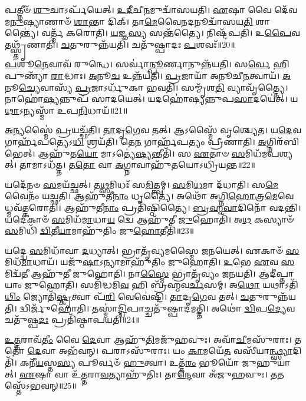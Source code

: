 𑌪𑌤𑍍𑌨𑍀𑍞᳴ \ul{𑌶𑍁}\-𑌚𑌾\-𑌽𑌰𑍍𑌪᳴𑌯𑍇𑌤𑍍।
\-\ul{𑌉}\-\-\ul{𑌦𑍀}\-𑌚𑍀\-\ul{𑌨}\-𑌮𑍁𑌦𑍍𑌵𑌾᳴𑌸𑌯𑌤𑌿।
\-\ul{𑌏}\-𑌷𑌾 𑌵𑍈 𑌦𑍇᳴𑌵𑌮\-\ul{𑌨𑍁}\-𑌷𑍍𑌯𑌾𑌣𑌾𑍞᳴ \ul{𑌶𑌾}\-𑌨𑍍𑌤𑌾 𑌦𑌿𑌕𑍍।
𑌤𑌾\-\ul{𑌮𑍇}\-𑌵𑍈\-\ul{𑌨}\-𑌦𑌨𑍂𑌦𑍍𑌵𑌾᳴𑌸𑌯\-\ul{𑌤𑌿} 𑌶𑌾𑌨𑍍𑌤𑍍𑌯𑍈॑।
𑌵𑌰𑍍𑌤𑍍𑌮᳴ 𑌕𑌰𑍋𑌤𑌿।
\-\ul{𑌯}\-𑌜𑍍𑌞\-\ul{𑌸𑍍𑌯} 𑌸𑌨𑍍𑌤᳴𑌤𑍍𑌯𑍈।
𑌨𑌿𑌷𑍍𑌟᳴𑌪𑌤𑌿।
𑌉\-\ul{𑌪𑍈}\-𑌵 𑌤𑌥𑍍𑌸𑍍𑌤𑍃᳴𑌣𑌾𑌤𑌿।
\-\ul{𑌚}\-𑌤𑍁𑌰𑍁𑌨𑍍𑌨᳴𑌯𑌤𑌿।
𑌚𑌤𑍁᳴𑌷𑍍𑌪𑌾𑌦𑌃 \ul{𑌪}\-𑌶𑌵𑌃᳴॥20॥

\-\ul{𑌪}\-𑌶𑍂\-\ul{𑌨𑍇}\-𑌵𑌾𑌵᳴ 𑌰𑍁𑌨𑍍𑌧𑍇।
𑌸𑌰𑍍𑌵𑌾॑\-\ul{𑌨𑍍𑌪𑍂}\-𑌰𑍍𑌣𑌾𑌨𑍁𑌨𑍍𑌨᳴𑌯𑌤𑌿।
𑌸\-\ul{𑌰𑍍𑌵𑍇} 𑌹𑌿 𑌪𑍁𑌣𑍍𑌯𑌾᳴ \ul{𑌰𑌾}\-𑌦𑍍𑌧𑌾𑌃।
\-\ul{𑌅}\-𑌨𑍂\-\ul{𑌚} 𑌉𑌨𑍍𑌨᳴𑌯𑌤𑌿।
\-\ul{𑌪𑍍𑌰}\-𑌜𑌾𑌯𑌾᳴ 𑌅𑌨𑍂𑌚𑍀\-\ul{𑌨}\-𑌤𑍍𑌵𑌾𑌯᳴।
\-\ul{𑌅}\-𑌨𑍂\-\ul{𑌚𑍍𑌯𑍇}\-𑌵𑌾𑌸𑍍𑌯᳴ \ul{𑌪𑍍𑌰}\-𑌜𑌾\-𑌽𑌰𑍍𑌧𑍁᳴𑌕𑌾 𑌭𑌵𑌤𑌿।
𑌸𑌮𑍍𑌮𑍃᳴𑌶\-\ul{𑌤𑌿} 𑌵𑍍𑌯𑌾𑌵𑍃᳴𑌤𑍍𑌤𑍍𑌯𑍈।
𑌨𑌾𑌹𑍋॑\-\ul{𑌷𑍍𑌯}\-𑌨𑍍𑌨𑍁𑌪᳴ 𑌸𑌾𑌦𑌯𑍇𑌤𑍍।
𑌯𑌦𑌹𑍋॑𑌷𑍍𑌯𑌨𑍍𑌨𑍁𑌪\-\ul{𑌸𑌾}\-𑌦𑌯𑍇॑𑌤𑍍।
𑌯\-\ul{𑌥𑌾}\-𑌽𑌨𑍍𑌯𑌸𑍍𑌮𑌾᳴ 𑌉𑌪\-\ul{𑌨𑌿}\-𑌧𑌾𑌯᳴॥21॥

\-\ul{𑌅}\-𑌨𑍍𑌯𑌸𑍍𑌮𑍈॑ \ul{𑌪𑍍𑌰}\-𑌯𑌚𑍍𑌛᳴𑌤𑌿।
\-\ul{𑌤𑌾}\-𑌦𑍃\-\ul{𑌗𑍇}\-𑌵 𑌤𑌤𑍍।
𑌆𑌽𑌸𑍍𑌮𑍈᳴ 𑌵𑍃𑌶𑍍𑌚𑍍𑌯𑍇𑌤।
𑌯\-\ul{𑌦𑍇}\-𑌵 𑌗𑌾𑌰𑍍\mbox{}𑌹᳴𑌪𑌤𑍍𑌯𑍇𑌽\-\ul{𑌧𑌿} 𑌶𑍍𑌰𑌯᳴𑌤𑌿।
𑌤𑍇\-\ul{𑌨} 𑌗𑌾𑌰𑍍\mbox{}𑌹᳴𑌪𑌤𑍍𑌯𑌂 𑌪𑍍𑌰𑍀𑌣𑌾𑌤𑌿।
\-\ul{𑌅}\-𑌗𑍍𑌨𑌿𑌰᳴𑌬𑌿𑌭𑍇𑌤𑍍।
𑌆𑌹𑍁᳴𑌤\-\ul{𑌯𑍋} 𑌮𑌾𑌽𑌤𑍍𑌯𑍇॑\-\ul{𑌷𑍍𑌯}\-𑌨𑍍𑌤𑍀𑌤𑌿᳴।
𑌸 \ul{𑌏}\-𑌤𑌾𑍞 \ul{𑌸}\-𑌮𑌿𑌧᳴𑌮𑌪𑌶𑍍𑌯𑌤𑍍।
𑌤𑌾𑌮𑌾𑌽𑌧᳴𑌤𑍍𑌤।
𑌤\-\ul{𑌤𑍋} 𑌵𑌾 \ul{𑌅}\-𑌗𑍍𑌨𑌾𑌵𑌾𑌹𑍁᳴𑌤𑌯𑍋\-𑌽𑌧𑍍𑌰𑌿𑌯𑌨𑍍𑌤॥22॥

𑌯𑌦𑍇᳴𑌨𑍞 \ul{𑌸}\-𑌮𑌯᳴𑌚𑍍𑌛𑌤𑍍।
𑌤\-\ul{𑌥𑍍𑌸}\-𑌮𑌿𑌧𑌃᳴ 𑌸\-\ul{𑌮𑌿}\-𑌤𑍍𑌤𑍍𑌵𑌮𑍍।
\-\ul{𑌸}\-𑌮𑌿\-\ul{𑌧}\-𑌮𑌾 𑌦᳴𑌧𑌾𑌤𑌿।
𑌸\-\ul{𑌮𑍇}\-𑌵𑍈𑌨𑌂᳴ 𑌯𑌚𑍍𑌛𑌤𑌿।
𑌆𑌹𑍁᳴𑌤𑍀\-\ul{𑌨𑌾𑌂} 𑌧𑍃𑌤𑍍𑌯𑍈॑।
𑌅𑌥𑍋᳴ 𑌅𑌗𑍍𑌨𑌿\-\ul{𑌹𑍋}\-𑌤𑍍𑌰\-\ul{𑌮𑍇}\-𑌵𑍇𑌧𑍍𑌮𑌵᳴𑌤𑍍𑌕𑌰𑍋𑌤𑌿।
𑌆𑌹𑍁᳴𑌤𑍀\-\ul{𑌨𑌾𑌂} 𑌪𑍍𑌰𑌤𑌿᳴\-𑌷𑍍𑌠𑌿𑌤𑍍𑌯𑍈।
\-\ul{𑌬𑍍𑌰}\-\-\ul{𑌹𑍍𑌮}\-\-\ul{𑌵𑌾}\-𑌦𑌿𑌨𑍋᳴ 𑌵𑌦𑌨𑍍𑌤𑌿।
𑌯𑌦𑍇𑌕𑌾𑍞᳴ \ul{𑌸}\-𑌮𑌿𑌧᳴\-\ul{𑌮𑌾}\-𑌧𑌾\-\ul{𑌯} 𑌦𑍍𑌵𑍇 𑌆𑌹𑍁᳴𑌤𑍀 \ul{𑌜𑍁}\-𑌹𑍋𑌤𑌿᳴।
𑌅\-\ul{𑌥} 𑌕𑌸𑍍𑌯𑌾𑍞᳴ \ul{𑌸}\-𑌮𑌿𑌧𑌿᳴ \ul{𑌦𑍍𑌵𑌿}\-𑌤𑍀\-\ul{𑌯𑌾}\-𑌮𑌾𑌹𑍁᳴𑌤𑌿𑌂 𑌜𑍁\-\ul{𑌹𑍋}\-𑌤𑍀𑌤𑌿᳴॥23॥

𑌯𑌦𑍍𑌦𑍍𑌵𑍇 \ul{𑌸}\-𑌮𑌿𑌧𑌾᳴𑌵𑌾 \ul{𑌦}\-𑌧𑍍𑌯𑌾𑌤𑍍।
𑌭𑍍𑌰𑌾𑌤𑍃᳴𑌵𑍍𑌯𑌮𑌸𑍍𑌮𑍈 𑌜𑌨𑌯𑍇𑌤𑍍।
𑌏𑌕𑌾𑍞᳴ \ul{𑌸}\-𑌮𑌿𑌧᳴\-\ul{𑌮𑌾}\-𑌧𑌾𑌯᳴।
𑌯𑌜𑍁᳴\-\ul{𑌷𑌾}\-\-𑌽𑌨𑍍𑌯𑌾𑌮𑌾𑌹𑍁᳴𑌤𑌿𑌂 𑌜𑍁𑌹𑍋𑌤𑌿।
\-\ul{𑌉}\-𑌭𑍇 \ul{𑌏}\-𑌵 \ul{𑌸}\-𑌮𑌿𑌦𑍍𑌵᳴\-\ul{𑌤𑍀} 𑌆𑌹𑍁᳴𑌤𑍀 𑌜𑍁𑌹𑍋𑌤𑌿।
𑌨𑌾\-\ul{𑌸𑍍𑌮𑍈} 𑌭𑍍𑌰𑌾𑌤𑍃᳴𑌵𑍍𑌯𑌂 𑌜𑌨𑌯𑌤𑌿।
𑌆𑌦𑍀॑𑌪𑍍𑌤𑌾𑌯𑌾𑌂 𑌜𑍁𑌹𑍋𑌤𑌿।
𑌸𑌮𑌿᳴𑌦𑍍𑌧𑌮𑌿\-\ul{𑌵} 𑌹𑌿 𑌬𑍍𑌰᳴𑌹𑍍𑌮𑌵\-\ul{𑌰𑍍𑌚}\-𑌸𑌮𑍍।
𑌅\-\ul{𑌥𑍋} 𑌯𑌥𑌾\-𑌽𑌤𑌿᳴\-\ul{𑌥𑌿𑌂} 𑌜𑍍𑌯𑍋𑌤𑌿᳴\-\ul{𑌷𑍍𑌕𑍃}\-𑌤𑍍𑌵𑌾 𑌪᳴\-\ul{𑌰𑌿} 𑌵𑍇𑌵𑍇॑𑌷𑍍𑌟𑌿।
\-\ul{𑌤𑌾}\-𑌦𑍃\-\ul{𑌗𑍇}\-𑌵 𑌤𑌤𑍍।
\-\ul{𑌚}\-𑌤𑍁𑌰𑍁𑌨𑍍𑌨᳴𑌯𑌤𑌿।
𑌦𑍍𑌵𑌿𑌰𑍍𑌜𑍁᳴𑌹𑍋𑌤𑌿।
𑌤𑌸𑍍𑌮𑌾॑\-\ul{𑌦𑍍𑌦𑍍𑌵𑌿}\-𑌪𑌾𑌚𑍍𑌚𑌤𑍁᳴𑌷𑍍𑌪𑌾𑌦𑌮𑌤𑍍𑌤𑌿।
𑌅𑌥𑍋॑ \ul{𑌦𑍍𑌵𑌿}\-𑌪\-\ul{𑌦𑍍𑌯𑍇}\-𑌵 𑌚𑌤𑍁᳴𑌷𑍍𑌪\-\ul{𑌦𑌃} 𑌪𑍍𑌰𑌤𑌿᳴\-𑌷𑍍𑌠𑌾𑌪𑌯𑌤𑌿॥24॥\anuvakamend[\-\ul{𑌭}\-\-\ul{𑌵}\-\-\ul{𑌤𑌿} \ul{𑌪𑍍𑌰}\-\-\ul{𑌤𑌿}\-\-\ul{𑌷𑌿}\-𑌞𑍍𑌚𑌤𑌿᳴ 𑌗𑌮𑌯𑌤𑌿 \ul{𑌪𑍍𑌰}\-𑌤𑍍𑌯\-\ul{𑌕𑍍𑌪}\-𑌶𑌵᳴ 𑌉𑌪\-\ul{𑌨𑌿}\-𑌧𑌾𑌯𑌾॑𑌧𑍍𑌰𑌿\-\ul{𑌯}\-𑌨𑍍𑌤𑍇\-\ul{𑌤𑌿} 𑌤\-\ul{𑌚𑍍𑌚}\-𑌤𑍍𑌵𑌾𑌰𑌿᳴ 𑌚]

\-\ul{𑌉}\-\-\ul{𑌤𑍍𑌤}\-𑌰𑌾𑌵᳴\-\ul{𑌤𑍀𑌂} 𑌵𑍈 \ul{𑌦𑍇}\-𑌵𑌾 𑌆𑌹𑍁᳴\-\ul{𑌤𑌿}\-𑌮𑌜𑍁᳴𑌹𑌵𑍁𑌃।
𑌅𑌵𑌾᳴\-\ul{𑌚𑍀}\-𑌮𑌸𑍁᳴𑌰𑌾𑌃।
𑌤𑌤𑍋᳴ \ul{𑌦𑍇}\-𑌵𑌾 𑌅𑌭᳴𑌵𑌨𑍍।
𑌪𑌰𑌾𑌽𑌸𑍁᳴𑌰𑌾𑌃।
𑌯𑌂 \ul{𑌕𑌾}\-𑌮𑌯𑍇᳴\-\ul{𑌤} 𑌵𑌸𑍀᳴𑌯𑌾\-\ul{𑌨𑍍𑌥𑍍𑌸𑍍𑌯𑌾}\-𑌦𑌿𑌤𑌿᳴।
𑌕𑌨𑍀᳴\-\ul{𑌯}\-𑌸𑍍𑌤\-\ul{𑌸𑍍𑌯} 𑌪𑍂𑌰𑍍𑌵𑍞᳴ \ul{𑌹𑍁}\-𑌤𑍍𑌵𑌾।
𑌉𑌤𑍍𑌤᳴\-\ul{𑌰𑌂} 𑌭𑍂𑌯𑍋᳴ 𑌜𑍁𑌹𑍁𑌯𑌾𑌤𑍍।
\-\ul{𑌏}\-𑌷𑌾 𑌵𑌾 𑌉᳴\-\ul{𑌤𑍍𑌤}\-𑌰𑌾\-\ul{𑌵}\-𑌤𑍍𑌯𑌾𑌹𑍁᳴𑌤𑌿𑌃।
𑌤𑌾\-\ul{𑌨𑍍𑌦𑍇}\-𑌵𑌾 𑌅᳴𑌜𑍁𑌹𑌵𑍁𑌃।
𑌤\-\ul{𑌤}\-𑌸𑍍𑌤𑍇᳴\-𑌽𑌭𑌵𑌨𑍍॥25॥

